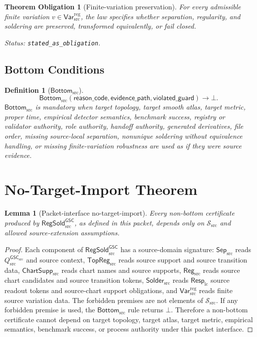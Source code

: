 \documentclass[11pt]{article}
\newcommand{\RespLC}{\mathsf{Resp}_{\mathrm{lc}}}
\newcommand{\GSC}{\mathsf{GSC}_{\mathrm{src}}}
\newcommand{\RegSold}{\mathsf{RegSold}_{\mathrm{src}}^{\mathsf{GSC}}}
\newcommand{\SepSrc}{\mathsf{Sep}_{\mathrm{src}}}
\newcommand{\TopRegSrc}{\mathsf{TopReg}_{\mathrm{src}}}
\newcommand{\ChartSuppSrc}{\mathsf{ChartSupp}_{\mathrm{src}}}
\newcommand{\RegSrc}{\mathsf{Reg}_{\mathrm{src}}}
\newcommand{\SolderSrc}{\mathsf{Solder}_{\mathrm{src}}}
\newcommand{\VarRegSrc}{\mathsf{Var}^{\mathrm{reg}}_{\mathrm{src}}}
\newcommand{\BottomSrc}{\mathsf{Bottom}_{\mathrm{src}}}
\newcommand{\Qsrc}{Q_{\mathrm{src}}^{\GSC}}
\newcommand{\Bot}{\bot}
\newtheorem{definition}{Definition}
\newtheorem{obligation}{Theorem Obligation}
\newtheorem{lemma}{Lemma}
\begin{document}
\begin{obligation}[Finite-variation preservation]
For every admissible finite variation \(v\in\VarRegSrc\), the law specifies
whether separation, regularity, and soldering are preserved, transformed
equivalently, or fail closed.

Status: \texttt{stated\_as\_obligation}.
\end{obligation}

\subsection{Bottom Conditions}

\begin{definition}[\(\BottomSrc\)]
\[
  \BottomSrc(\mathsf{reason\_code},\mathsf{evidence\_path},
             \mathsf{violated\_guard})
  \longrightarrow \Bot .
\]
\(\BottomSrc\) is mandatory when target topology, target smooth atlas, target
metric, proper time, empirical detector semantics, benchmark success,
registry or validator authority, role authority, handoff authority, generated
derivatives, file order, missing source-local separation, nonunique soldering
without equivalence handling, or missing finite-variation robustness are used
as if they were source evidence.
\end{definition}

\section{No-Target-Import Theorem}

\begin{lemma}[Packet-interface no-target-import]
Every non-bottom certificate produced by \(\RegSold\), as defined in this
packet, depends only on \(\mathcal{S}_{\mathrm{src}}\) and allowed
source-extension assumptions.
\end{lemma}

\begin{proof}
Each component of \(\RegSold\) has a source-domain signature:
\(\SepSrc\) reads \(\Qsrc\) and source context, \(\TopRegSrc\) reads source
support and source transition data, \(\ChartSuppSrc\) reads chart names and
source supports, \(\RegSrc\) reads source chart candidates and source
transition tokens, \(\SolderSrc\) reads \(\RespLC\) source readout tokens and
source-chart support obligations, and \(\VarRegSrc\) reads finite source
variation data. The forbidden premises are not elements of
\(\mathcal{S}_{\mathrm{src}}\). If any forbidden premise is used, the
\(\BottomSrc\) rule returns \(\Bot\). Therefore a non-bottom certificate
cannot depend on target topology, target atlas, target metric, empirical
semantics, benchmark success, or process authority under this packet
interface.
\end{proof}
\end{document}
